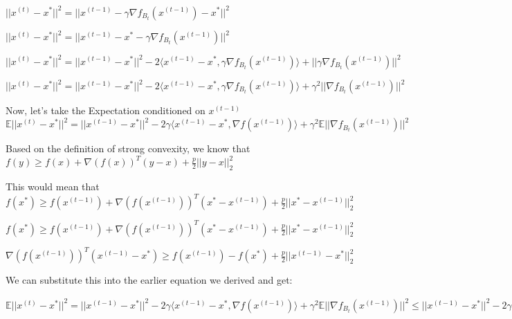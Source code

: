 $||x^{(t)} - x^*||^2 = ||x^{(t - 1)} - \gamma \nabla f_{B_t}(x^{(t - 1)}) - x^*||^2$ \newline 

$||x^{(t)} - x^*||^2 = ||x^{(t - 1)} - x^* - \gamma \nabla f_{B_t}(x^{(t - 1)})||^2$ \newline 


$||x^{(t)} - x^*||^2 = ||x^{(t - 1)} - x^*||^2 - 2\langle x^{(t - 1)} - x^*,  \gamma \nabla f_{B_t}(x^{(t - 1)})\rangle + ||\gamma \nabla f_{B_t}(x^{(t - 1)})||^2$

$||x^{(t)} - x^*||^2 = ||x^{(t - 1)} - x^*||^2 - 2\langle x^{(t - 1)} - x^*,  \gamma \nabla f_{B_t}(x^{(t - 1)})\rangle + \gamma^2 ||\nabla f_{B_t}(x^{(t - 1)})||^2$

Now, let's take the Expectation conditioned on $x^{(t - 1)}$ \newline 
$\mathbb{E}||x^{(t)} - x^*||^2 = ||x^{(t - 1)} - x^*||^2 - 2\gamma \langle x^{(t - 1)} - x^*,  \nabla f(x^{(t - 1)})\rangle + \gamma^2 \mathbb{E} ||\nabla f_{B_t}(x^{(t - 1)})||^2$ \newline 


Based on the definition of strong convexity, we know that $f(y) \geq f(x) + \nabla(f(x))^T (y - x) + \frac{p}{2} ||y - x||^2_2$ \newline 


This would mean that $f(x^*) \geq f(x^{(t - 1)}) + \nabla(f(x^{(t - 1)}))^T (x^* - x^{(t - 1)}) + \frac{p}{2} ||x^* - x^{(t - 1)}||^2_2$ \newline 


$f(x^*) \geq f(x^{(t - 1)}) + \nabla(f(x^{(t - 1)}))^T (x^* - x^{(t - 1)}) + \frac{p}{2} ||x^* - x^{(t - 1)}||^2_2$ \newline 


$\nabla(f(x^{(t - 1)}))^T (x^{(t - 1)} - x^*) \geq f(x^{(t - 1)}) - f(x^*) + \frac{p}{2} ||x^{(t - 1)} - x^*||^2_2$ \newline 

We can substitute this into the earlier equation we derived and get: \newline 

$\mathbb{E}||x^{(t)} - x^*||^2 = ||x^{(t - 1)} - x^*||^2 - 2\gamma \langle x^{(t - 1)} - x^*,  \nabla f(x^{(t - 1)})\rangle + \gamma^2 \mathbb{E} ||\nabla f_{B_t}(x^{(t - 1)})||^2 \leq ||x^{(t - 1)} - x^*||^2 - 2\gamma (f(x^{(t - 1)}) - f(x^*) + \frac{p}{2} ||x^{(t - 1)} - x^*||^2_2) + \gamma^2 \mathbb{E} ||\nabla f_{B_t}(x^{(t - 1)})||^2$ \newline 

